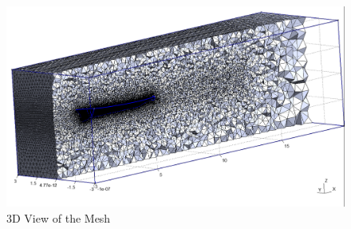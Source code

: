 \documentclass[12pt]{article} %
\begin{document}
\begin{figure}[ht]
    \centering
    \includegraphics[width=1\textwidth]{Mesh_3D.png}
    \caption{3D View of the Mesh}
\end{figure}
\end{document}
